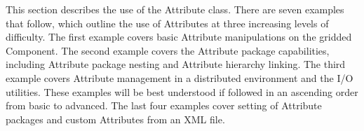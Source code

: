 %


This section describes the use of the Attribute class.  There are seven examples that follow, which outline the use of Attributes at three increasing levels of difficulty.  The first example covers basic Attribute manipulations on the gridded Component.  The second example covers the Attribute package capabilities, including Attribute package nesting and Attribute hierarchy linking.  The third example covers Attribute management in a distributed environment and the I/O utilities.  These examples will be best understood if followed in an ascending order from basic to advanced.  The last four examples cover setting of Attribute packages and custom Attributes from an XML file.
